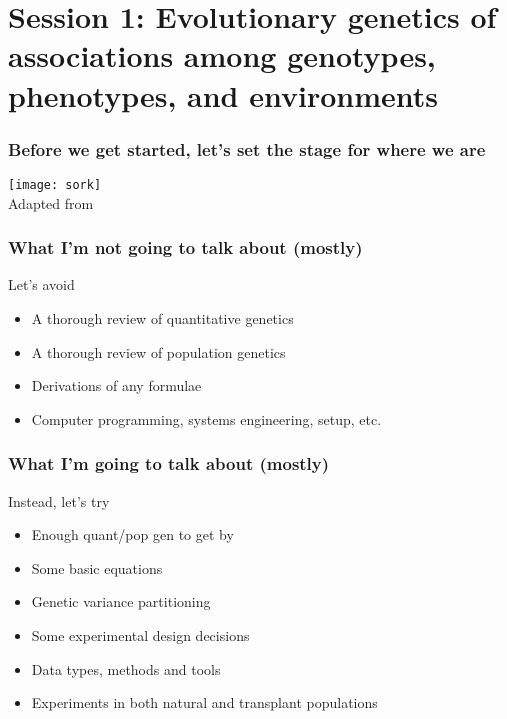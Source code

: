 
\section[Session 1]{Session 1: Evolutionary genetics of associations among
genotypes, phenotypes, and environments}

\begin{frame}
\frametitle{Before we get started, let's set the stage for where we are}
\begin{block}{}
\centering
\texttt{[image: sork]}\\
Adapted from \citet[Figure 1]{Sork:2013tb}
\end{block}{}
\end{frame}

\begin{frame}
\frametitle{What I'm not going to talk about (mostly)}
\begin{block}{Let's avoid}
\begin{itemize}
\item{A thorough review of quantitative genetics}
\item{A thorough review of population genetics}
\item{Derivations of any formulae}
\item{Computer programming, systems engineering, setup, etc.}
\end{itemize}
\end{block}
\end{frame}

\begin{frame}
\frametitle{What I'm going to talk about (mostly)}
\begin{block}{Instead, let's try}
\begin{itemize}
\item{Enough quant/pop gen to get by}
\item{Some basic equations}
\item{Genetic variance partitioning}
\item{Some experimental design decisions}
\item{Data types, methods and tools}
\item{Experiments in both natural and transplant populations}
\end{itemize}
\end{block}
\end{frame}


